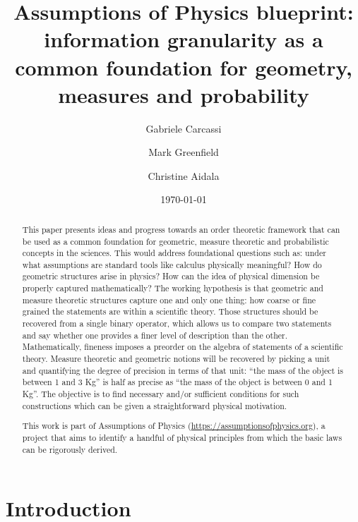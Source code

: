 \documentclass[10pt, onecolumn, longbibliography, nofootinbib]{revtex4-2}
\begin{document}
\title{Assumptions of Physics blueprint: information granularity as a common foundation for geometry, measures and probability}
\author{Gabriele Carcassi}
\author{Mark Greenfield}
\author{Christine Aidala}
\date{\today}

\begin{abstract}
    This paper presents ideas and progress towards an order theoretic framework that can be used as a common foundation for geometric, measure theoretic and probabilistic concepts in the sciences. This would address foundational questions such as: under what assumptions are standard tools like calculus physically meaningful? How do geometric structures arise in physics? How can the idea of physical dimension be properly captured mathematically? The working hypothesis is that geometric and measure theoretic structures capture one and only one thing: how coarse or fine grained the statements are within a scientific theory. Those structures should be recovered from a single binary operator, which allows us to compare two statements and say whether one provides a finer level of description than the other. Mathematically, fineness imposes a preorder on the algebra of statements of a scientific theory. Measure theoretic and geometric notions will be recovered by picking a unit and quantifying the degree of precision in terms of that unit: ``the mass of the object is between 1 and 3 Kg'' is half as precise as ``the mass of the object is between 0 and 1 Kg''. The objective is to find necessary and/or sufficient conditions for such constructions which can be given a straightforward physical motivation.
    
	This work is part of Assumptions of Physics (\url{https://assumptionsofphysics.org}), a project that aims to identify a handful of physical principles from which the basic laws can be rigorously derived.
\end{abstract}

\maketitle

\section{Introduction}
\end{document}

